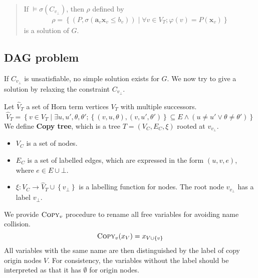 \documentclass[a4paper,12pt]{article}
\begin{document}
\begin{quote}
If $\models \sigma(C_{v_\bot})$, then $\rho$ defined by
\begin{align*}
 \rho = \left\lbrace
  \left( P, \sigma(\mathbf{a}_v \mathbf{x}_v \leq b_v) \right) \middle|
  \forall v \in V_T; \varphi(v) = P(\mathbf{x}_v)
 \right\rbrace
\end{align*}
is a solution of $G$.
\end{quote}

\subsection{DAG problem}

If $C_{v_\bot}$ is unsatisfiable, no simple solution exists for
$G$. We now try to give a solution by relaxing the constraint
$C_{v_\bot}$.

Let $\hat V_T$ a set of Horn term vertices $V_T$ with multiple
successors.
\[ \hat V_T = \left\lbrace v \in V_T \middle|
\exists u, u', \theta, \theta';
\left\lbrace (v,u,\theta), (v,u',\theta') \right\rbrace \subseteq E \wedge
(u \ne u' \vee \theta \ne \theta') \right\rbrace \]
We define \textbf{Copy tree}, which is a tree $T=(V_C,E_C,\xi)$
rooted at $v_{v_\bot}$.
\begin{itemize}
\item $V_C$ is a set of nodes.
\item $E_C$ is a set of labelled edges, which are expressed in the
  form $(u,v,e)$, where $e \in E \cup {\bot}$.
\item $\xi: V_C \rightarrow \hat V_T \cup \left\lbrace v_\bot
  \right\rbrace$ is a labelling function for nodes. The root node
  $v_{v_\bot}$ has a label $v_\bot$.
\end{itemize}

We provide $\textsc{Copy}_v$ procedure to rename all free variables
for avoiding name collision.
\[ \textsc{Copy}_v (x_V) = x_{V \cup \left\lbrace v \right\rbrace} \]
All variables with the same name are then distinguished by the label of copy origin
nodes $V$. For consistency, the variables without the label should be
interpreted as that it has $\emptyset$ for origin nodes.
\end{document}
